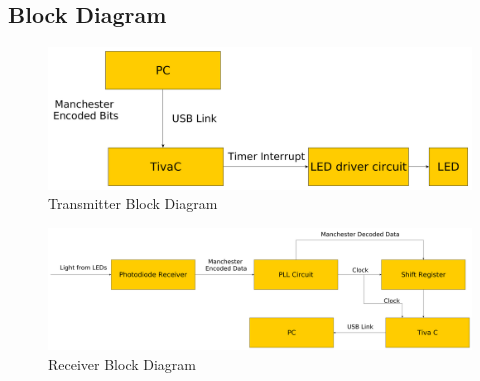\documentclass{article}
\begin{document}
\subsection{Block Diagram}
\begin{figure}[h]
  \centering
  \includegraphics[scale=0.25]{images/tx_bd}
  \caption{Transmitter Block Diagram}
  \label{fig:1}
\end{figure}
\vspace{1cm}
\begin{figure}[h]
  \centering
  \includegraphics[scale=0.18]{images/rx_bd}
  \caption{Receiver Block Diagram}
  \label{fig:2}
\end{figure}
\end{document}
